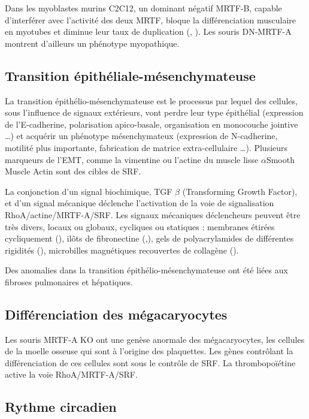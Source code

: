 Dans les myoblastes murins C2C12, un dominant négatif MRTF-B, capable d'interférer avec l'activité des deux MRTF, bloque la différenciation musculaire en myotubes et diminue leur taux de duplication (\cite{selvaraj_megakaryoblastic_2003}, \cite{cen_megakaryoblastic_2003}). 
Les souris DN-MRTF-A montrent d'ailleurs un phénotype myopathique. 




\subsection{Transition épithéliale-mésenchymateuse}

La transition épithélio-mésenchymateuse est le processus par lequel des cellules, sous l'influence de signaux extérieurs, vont perdre leur type épithélial (expression de l'E-cadherine, polarisation apico-basale, organisation en monocouche jointive \dots) et acquérir un phénotype mésenchymateux (expression de N-cadherine, motilité plus importante, fabrication de matrice extra-cellulaire \dots). 
Plusieurs marqueurs de l'EMT, comme la vimentine ou l'actine du muscle lisse $\alpha$Smooth Muscle Actin sont des cibles de SRF. 

La conjonction d'un signal biochimique, TGF $\beta$ (Transforming Growth Factor), et d'un signal mécanique déclenche l'activation de la voie de signalisation RhoA/actine/MRTF-A/SRF. 
Les signaux mécaniques déclencheurs peuvent être très divers, locaux ou globaux, cycliques ou statiques : membranes étirées cycliquement (\cite{maier_tenascin-c_2008}), ilôts de fibronectine  (\cite{gomez_tissue_2010},\cite{connelly_actin_2010}), gels de polyacrylamides de différentes rigidités (\cite{huang_matrix_2012}), microbilles magnétiques recouvertes de collagène (\cite{chan_force-induced_2010}). 

Des anomalies dans la transition épithélio-mésenchymateuse ont été liées aux fibroses pulmonaires et hépatiques.

\subsection{Différenciation des mégacaryocytes}

Les souris MRTF-A KO ont une genèse anormale des mégacaryocytes, les cellules de la moelle osseuse qui sont à l'origine des plaquettes. Les gènes contrôlant la différenciation de ces cellules sont sous le contrôle de SRF. La thrombopoïétine active la voie RhoA/MRTF-A/SRF. 

\subsection{Rythme circadien}

